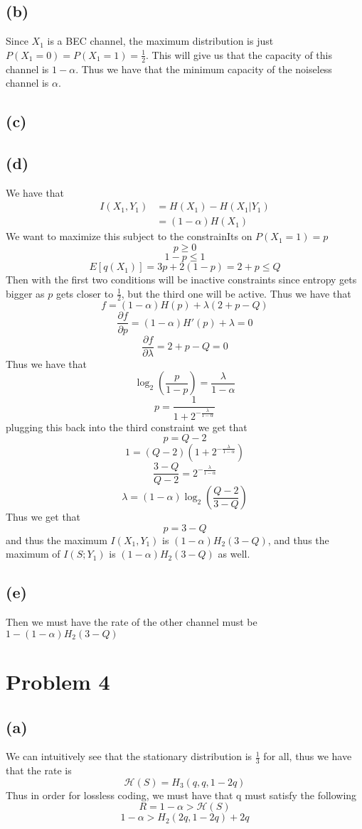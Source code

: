 \subsection*{(b)}
Since $X_1$ is a BEC channel, the maximum
distribution is just $P(X_1=0)=P(X_1=1)=\frac{1}{2}$. 
This will give us that the capacity of this channel is 
$1-\alpha$. Thus we have that the minimum capacity
of the noiseless channel is $\alpha$.
\subsection*{(c)}

\subsection*{(d)}
We have that
\begin{align*}
    I(X_1,Y_1)&=H(X_1)-H(X_1|Y_1)\\
    &=(1-\alpha)H(X_1)
\end{align*}
We want to maximize this subject
to the constrainIts on $P(X_1=1)=p$
$$p\geq 0$$
$$1-p\leq 1$$
$$E[q(X_1)]=3p+2(1-p)=2+p\leq Q$$
Then with the first two conditions will be inactive constraints
since entropy gets bigger as $p$ gets closer to $\frac{1}{2}$,
but the third one will be active. Thus we have that
$$f=(1-\alpha)H(p)+\lambda (2+p-Q)$$
$$\frac{\partial f}{\partial p}=(1-\alpha)H'(p)+\lambda=0$$
$$\frac{\partial f}{\partial \lambda}=2+p-Q=0$$
Thus we have that
$$\log_2\left(\frac{p}{1-p}\right)=\frac{\lambda}{1-\alpha}$$
$$p=\frac{1}{1+2^{-\frac{\lambda}{1-\alpha}}}$$
plugging this back into the third constraint we get that
$$p=Q-2$$
$$1=(Q-2)(1+2^{-\frac{\lambda}{1-\alpha}})$$
$$\frac{3-Q}{Q-2}=2^{-\frac{\lambda}{1-\alpha}}$$
$$\lambda=(1-\alpha)\log_2\left(\frac{Q-2}{3-Q}\right)$$
Thus we get that
$$p=3-Q$$
and thus the maximum $I(X_1,Y_1)$ is $(1-\alpha)H_2(3-Q)$, 
and thus the maximum of $I(S;Y_1)$ is $\boxed{(1-\alpha)H_2(3-Q)}$
as well.
\subsection*{(e)}
Then we must have the rate of 
the other channel must be $1-(1-\alpha)H_2(3-Q)$
\section*{Problem 4}
\subsection*{(a)}
We can intuitively see that the stationary distribution
is $\frac{1}{3}$ for all, thus we have that the rate 
is 
$$\mathcal{H}(S)=H_3(q,q,1-2q)$$
Thus in order for lossless coding, we must have that q must
satisfy the following
$$R=1-\alpha>\mathcal{H}(S)$$
$$\boxed{1-\alpha>H_2(2q,1-2q)+2q}$$
